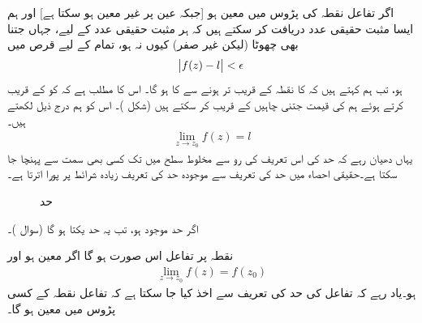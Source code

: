 اگر تفاعل  نقطہ  کی پڑوس میں معین ہو [جبکہ عین  پر  غیر معین ہو سکتا ہے] اور ہم ایسا مثبت حقیقی عدد  دریافت کر سکتے ہیں کہ ہر مثبت حقیقی  عدد  کے لیے، جہاں  جتنا بھی چھوٹا (لیکن غیر صفر) کیوں نہ ہو، تمام  کے لیے قرص  میں 
 \begin{align}\label{مساوات_مخلوط_حد_تعریف_الف}
\abs{f(z)-l}<\epsilon
\end{align}
ہو، تب ہم کہتے ہیں کہ  کا  نقطہ  کے قریب تر ہونے سے  کا   ہو گا۔ اس کا مطلب ہے کہ  کو  کے  قریب کرتے ہوئے ہم   کی قیمت  جتنی چاہیں   کے قریب کر سکتے ہیں (شکل )۔ اس کو ہم درج ذیل لکھتے ہیں۔
\begin{align}\label{مساوات_مخلوط_حد_تعریف_ب}
\lim_{z\to z_0} f(z)=l
\end{align}
یہاں دھیان رہے کہ حد کی اس تعریف کی رو سے  مخلوط سطح میں  تک کسی بھی سمت سے پہنچا جا سکتا ہے۔حقیقی احصاء میں حد کی تعریف سے موجودہ حد کی تعریف زیادہ شرائط پر پورا اترتا  ہے۔
%
\begin{figure}
\centering
{}
\caption{حد}
\label{شکل_مخلوط_حد_تعریف}
\end{figure}

اگر حد موجود ہو، تب یہ حد یکتا ہو گا (سوال )۔

نقطہ  پر تفاعل  اس صورت  ہو گا اگر  معین ہو اور
\begin{align}
\lim_{z\to z_0}f(z)=f(z_0)
\end{align}
ہو۔یاد رہے کہ تفاعل کی حد کی تعریف سے اخذ کیا جا سکتا ہے کہ تفاعل  نقطہ  کے کسی  پڑوس میں معین ہو گا۔

